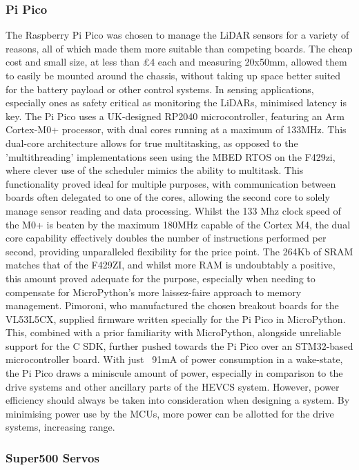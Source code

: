 \documentclass [12pt]{article}
\begin{document}
\subsubsection{Pi Pico}
The Raspberry Pi Pico was chosen to manage the LiDAR sensors for a variety of reasons, all of which made them more suitable than competing boards. The cheap cost and small size, at less than £4 each and measuring 20x50mm, allowed them to easily be mounted around the chassis, without taking up space better suited for the battery payload or other control systems.
In sensing applications, especially ones as safety critical as monitoring the LiDARs, minimised latency is key. The Pi Pico uses a UK-designed RP2040 microcontroller, featuring an Arm Cortex-M0+ processor, with dual cores running at a maximum of 133MHz. This dual-core architecture allows for true multitasking, as opposed to the 'multithreading' implementations seen using the MBED RTOS on the F429zi, where clever use of the scheduler mimics the ability to multitask. This functionality proved ideal for multiple purposes, with communication between boards often delegated to one of the cores, allowing the second core to solely manage sensor reading and data processing.
Whilst the 133 Mhz clock speed of the M0+ is beaten by the maximum 180MHz capable of the Cortex M4, the dual core capability effectively doubles the number of instructions performed per second, providing unparalleled flexibility for the price point. The 264Kb of SRAM matches that of the F429ZI, and whilst more RAM is undoubtably a positive, this amount proved adequate for the purpose, especially when needing to compensate for MicroPython's more laissez-faire approach to memory management.
Pimoroni, who manufactured the chosen breakout boards for the VL53L5CX, supplied firmware written specially for the Pi Pico in MicroPython. This, combined with a prior familiarity with MicroPython, alongside unreliable support for the C SDK, further pushed towards the Pi Pico over an STM32-based microcontroller board.
With just ~91mA of power consumption in a wake-state, the Pi Pico draws a miniscule amount of power, especially in comparison to the drive systems and other ancillary parts of the HEVCS system. However, power efficiency should always be taken into consideration when designing a system. By minimising power use by the MCUs, more power can be allotted for the drive systems, increasing range.


\subsubsection{Super500 Servos}
\end{document}
